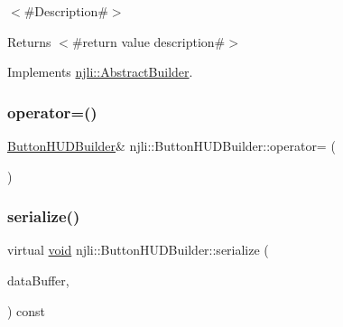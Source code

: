 $<$\#\+Description\#$>$

\begin{DoxyReturn}{Returns}
$<$\#return value description\#$>$ 
\end{DoxyReturn}


Implements \mbox{\hyperlink{classnjli_1_1_abstract_builder_a3e6e553e06d1ca30517ad5fb0bd4d000}{njli\+::\+Abstract\+Builder}}.

\mbox{\label{classnjli_1_1_button_h_u_d_builder_aece9616ae7fcb8d690109f73cc416072}} 
\subsubsection{\texorpdfstring{operator=()}{operator=()}}
{\footnotesize\ttfamily \mbox{\hyperlink{classnjli_1_1_button_h_u_d_builder}{Button\+H\+U\+D\+Builder}}\& njli\+::\+Button\+H\+U\+D\+Builder\+::operator= (\begin{DoxyParamCaption}\item[{const \mbox{\hyperlink{classnjli_1_1_button_h_u_d_builder}{Button\+H\+U\+D\+Builder}} \&}]{ }\end{DoxyParamCaption})\hspace{0.3cm}{\ttfamily [protected]}}

\mbox{\label{classnjli_1_1_button_h_u_d_builder_a8fabff458b635395dfcaed73aec4f438}} 
\subsubsection{\texorpdfstring{serialize()}{serialize()}}
{\footnotesize\ttfamily virtual \mbox{\hyperlink{_thread_8h_af1e856da2e658414cb2456cb6f7ebc66}{void}} njli\+::\+Button\+H\+U\+D\+Builder\+::serialize (\begin{DoxyParamCaption}\item[{\mbox{\hyperlink{_thread_8h_af1e856da2e658414cb2456cb6f7ebc66}{void}} $\ast$}]{data\+Buffer,  }\item[{bt\+Serializer $\ast$}]{ }\end{DoxyParamCaption}) const\hspace{0.3cm}{\ttfamily [virtual]}}



